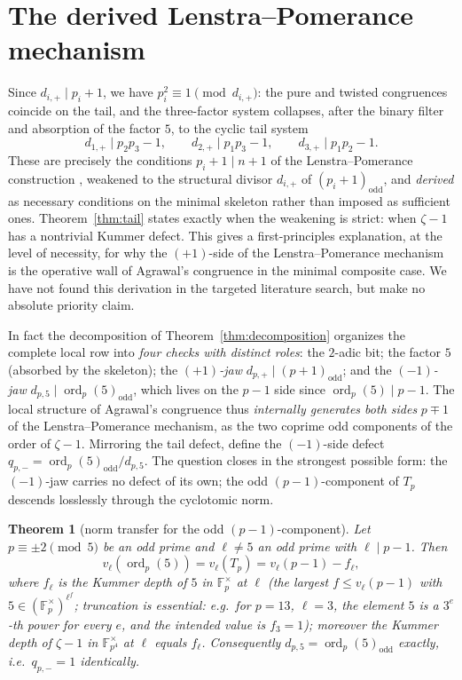 \documentclass[11pt]{amsart}
\newtheorem{theorem}{Theorem}[section]
\theoremstyle{definition}
\theoremstyle{remark}
\newcommand{\F}{\mathbb{F}}
\newcommand{\ord}{\operatorname{ord}}
\begin{document}
\section{The derived Lenstra--Pomerance mechanism}\label{sec:lp}

Since $d_{i,+} \mid p_i + 1$, we have $p_i^2 \equiv 1 \pmod{d_{i,+}}$: the
pure and twisted congruences coincide on the tail, and the three-factor
system collapses, after the binary filter and absorption of the factor $5$,
to the cyclic tail system
\[
d_{1,+} \mid p_2p_3 - 1,\qquad
d_{2,+} \mid p_1p_3 - 1,\qquad
d_{3,+} \mid p_1p_2 - 1.
\]
These are precisely the conditions $p_i + 1 \mid n + 1$ of the
Lenstra--Pomerance construction \cite{LP}, weakened to the structural
divisor $d_{i,+}$ of $(p_i+1)_{\mathrm{odd}}$, and \emph{derived} as
necessary conditions on the minimal skeleton rather than imposed as
sufficient ones. Theorem~\ref{thm:tail} states exactly when the weakening is
strict: when $\zeta - 1$ has a nontrivial Kummer defect. This gives a
first-principles explanation, at the level of necessity, for why the
$(+1)$-side of the Lenstra--Pomerance mechanism is the operative wall of
Agrawal's congruence in the minimal composite case. We have not found this
derivation in the targeted literature search, but make no absolute priority
claim.

In fact the decomposition of Theorem~\ref{thm:decomposition} organizes the
complete local row into \emph{four checks with distinct roles}: the
$2$-adic bit; the factor $5$ (absorbed by the skeleton); the
\emph{$(+1)$-jaw} $d_{p,+} \mid (p+1)_{\mathrm{odd}}$; and the
\emph{$(-1)$-jaw} $d_{p,5} \mid \ord_p(5)_{\mathrm{odd}}$, which lives on
the $p-1$ side since $\ord_p(5) \mid p - 1$. The local structure of
Agrawal's congruence thus \emph{internally generates both sides}
$p \mp 1$ of the Lenstra--Pomerance mechanism, as the two coprime odd
components of the order of $\zeta - 1$. Mirroring the tail defect, define
the $(-1)$-side defect $q_{p,-} = \ord_p(5)_{\mathrm{odd}}/d_{p,5}$. The
question closes in the strongest possible form: the $(-1)$-jaw carries no
defect of its own; the odd $(p-1)$-component of $T_p$ descends
losslessly through the cyclotomic norm.

\begin{theorem}[norm transfer for the odd $(p-1)$-component]\label{thm:minusjaw}
Let $p \equiv \pm2 \pmod 5$ be an odd prime and $\ell \ne 5$ an odd prime
with $\ell \mid p - 1$. Then
\[
v_\ell(\ord_p(5)) = v_\ell(T_p) = v_\ell(p-1) - f_\ell,
\]
where $f_\ell$ is the Kummer depth of $5$ in $\F_p^\times$ at $\ell$
(the largest $f \le v_\ell(p-1)$ with $5 \in (\F_p^\times)^{\ell^f}$;
truncation is essential: e.g.\ for $p = 13$, $\ell = 3$, the element $5$
is a $3^e$-th power for every $e$, and the intended value is $f_3 = 1$);
moreover the Kummer
depth of $\zeta - 1$ in $\F_{p^4}^\times$ at $\ell$ equals $f_\ell$.
Consequently $d_{p,5} = \ord_p(5)_{\mathrm{odd}}$ exactly, i.e.\
\emph{$q_{p,-} = 1$ identically}.
\end{theorem}
\end{document}
